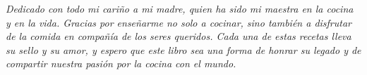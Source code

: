 
\thispagestyle{empty}
\vspace*{5cm}
\begin{center}
    {\Large \textit{
        Dedicado con todo mi cariño a mi madre, quien ha sido mi maestra en la cocina y en la vida. Gracias por enseñarme no solo a cocinar, sino también a disfrutar de la comida en compañía de los seres queridos. Cada una de estas recetas lleva su sello y su amor, y espero que este libro sea una forma de honrar su legado y de compartir nuestra pasión por la cocina con el mundo.}}
\end{center}
